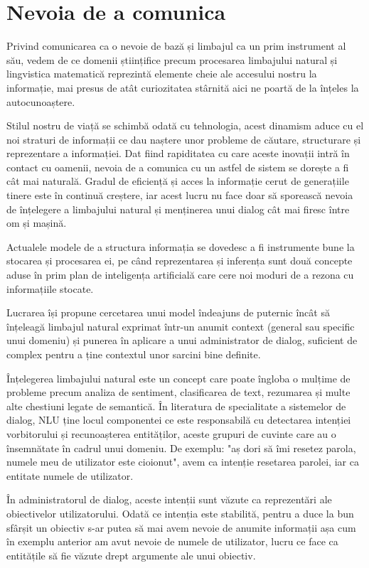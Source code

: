 \section{Nevoia de a comunica}

Privind comunicarea ca o nevoie de bază și limbajul ca un prim instrument al său, vedem de ce domenii științifice precum procesarea limbajului natural și lingvistica matematică reprezintă elemente cheie ale accesului nostru la informație, mai presus de atât curiozitatea stârnită aici ne poartă de la înțeles la autocunoaștere.

Stilul nostru de viață se schimbă odată cu tehnologia, acest dinamism aduce cu el noi straturi de informații ce dau naștere unor probleme de căutare, structurare și reprezentare a informației. Dat fiind rapiditatea cu care aceste inovații intră în contact cu oamenii, nevoia de a comunica cu un astfel de sistem se dorește a fi cât mai naturală. Gradul de eficiență și acces la informație cerut de generațiile tinere este în continuă creștere, iar acest lucru nu face doar să sporească nevoia de înțelegere a limbajului natural și menținerea unui dialog cât mai firesc între om și mașină.

Actualele modele de a structura informația se dovedesc a fi instrumente bune la stocarea și procesarea ei, pe când reprezentarea și inferența sunt două concepte aduse în prim plan de inteligența artificială care cere noi moduri de a rezona cu informațiile stocate.

Lucrarea își propune cercetarea unui model îndeajuns de puternic încât să înțeleagă limbajul natural exprimat într-un anumit context (general sau specific unui domeniu) și punerea în aplicare a unui administrator de dialog, suficient de complex pentru a ține contextul unor sarcini bine definite.

Înțelegerea limbajului natural este un concept care poate îngloba o mulțime de probleme precum analiza de sentiment, clasificarea de text, rezumarea și multe alte chestiuni legate de semantică. În literatura de specialitate a sistemelor de dialog, NLU ține locul componentei ce este responsabilă cu detectarea intenției vorbitorului și recunoașterea entităților, aceste grupuri de cuvinte care au o însemnătate în cadrul unui domeniu.
De exemplu: "aș dori să îmi resetez parola, numele meu de utilizator este cioionut", avem ca intenție resetarea parolei, iar ca entitate numele de utilizator.

În administratorul de dialog, aceste intenții sunt văzute ca reprezentări ale obiectivelor utilizatorului. Odată ce intenția este stabilită, pentru a duce la bun sfârșit un obiectiv s-ar putea să mai avem nevoie de anumite informații așa cum în exemplu anterior am avut nevoie de numele de utilizator, lucru ce face ca entitățile să fie văzute drept argumente ale unui obiectiv.

